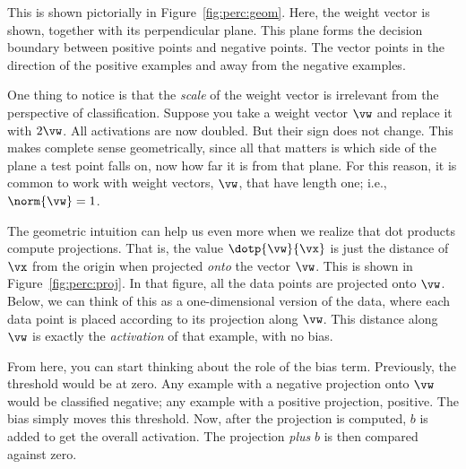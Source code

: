 \MoveNextFigure{-1cm}

This is shown pictorially in Figure~\ref{fig:perc:geom}.  Here, the
weight vector is shown, together with its perpendicular plane.  This
plane forms the decision boundary between positive points and negative
points.  The vector points in the direction of the positive examples
and away from the negative examples.

One thing to notice is that the \emph{scale} of the weight vector is
irrelevant from the perspective of classification.  Suppose you take a
weight vector $\vw$ and replace it with $2 \vw$.  All activations are
now doubled.  But their sign does not change.  This makes complete
sense geometrically, since all that matters is which side of the plane
a test point falls on, now how far it is from that plane.  For this
reason, it is common to work with 
weight vectors, $\vw$, that have length one; i.e., $\norm{\vw} = 1$.


\MoveNextFigure{-2cm}

The geometric intuition can help us even more when we realize that
dot products compute projections.  That is, the value $\dotp{\vw}{\vx}$
is just the distance of $\vx$ from the origin when projected
\emph{onto} the vector $\vw$.  This is shown in
Figure~\ref{fig:perc:proj}.  In that figure, all the data points are
projected onto $\vw$.  Below, we can think of this as a
one-dimensional version of the data, where each data point is placed
according to its projection along $\vw$.  This distance along $\vw$ is
exactly the \emph{activation} of that example, with no bias.

From here, you can start thinking about the role of the bias term.
Previously, the threshold would be at zero.  Any example with a
negative projection onto $\vw$ would be classified negative; any
example with a positive projection, positive.  The bias simply moves
this threshold.  Now, after the projection is computed, $b$ is added
to get the overall activation.  The projection \emph{plus} $b$ is then
compared against zero.

